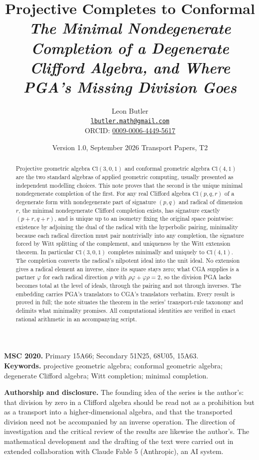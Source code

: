 \documentclass[11pt]{article}
\title{\bfseries Projective Completes to Conformal\\[4pt]
  \large\itshape The Minimal Nondegenerate Completion of a Degenerate Clifford Algebra, and Where PGA's Missing Division Goes}
\author{Leon Butler\\ \normalsize\href{mailto:lbutler.math@gmail.com}{\texttt{lbutler.math@gmail.com}}\\ \normalsize ORCID: \href{https://orcid.org/0009-0006-4449-5617}{0009-0006-4449-5617}}
\date{Version 1.0, September 2026 \textperiodcentered{} Transport Papers, T2}
\theoremstyle{definition}
\newcommand{\Cl}{\mathrm{Cl}}
\begin{document}
\maketitle

\begin{abstract}
\normalsize
Projective geometric algebra $\Cl(3,0,1)$ and conformal geometric algebra $\Cl(4,1)$ are the two standard algebras of applied geometric computing, usually presented as independent modelling choices. This note proves that the second is the unique minimal nondegenerate completion of the first. For any real Clifford algebra $\Cl(p,q,r)$ of a degenerate form with nondegenerate part of signature $(p,q)$ and radical of dimension $r$, the minimal nondegenerate Clifford completion exists, has signature exactly $(p{+}r, q{+}r)$, and is unique up to an isometry fixing the original space pointwise: existence by adjoining the dual of the radical with the hyperbolic pairing, minimality because each radical direction must pair nontrivially into any completion, the signature forced by Witt splitting of the complement, and uniqueness by the Witt extension theorem. In particular $\Cl(3,0,1)$ completes minimally and uniquely to $\Cl(4,1)$. The completion converts the radical's nilpotent ideal into the unit ideal. No extension gives a radical element an inverse, since its square stays zero; what CGA supplies is a partner $\varphi$ for each radical direction $\rho$ with $\rho\varphi + \varphi\rho = 2$, so the division PGA lacks becomes total at the level of ideals, through the pairing and not through inverses. The embedding carries PGA's translators to CGA's translators verbatim. Every result is proved in full; the note situates the theorem in the series' transport-rule taxonomy and delimits what minimality promises. All computational identities are verified in exact rational arithmetic in an accompanying script.
\end{abstract}

\medskip
\noindent\textbf{MSC 2020.} Primary 15A66; Secondary 51N25, 68U05, 15A63.\\
\textbf{Keywords.} projective geometric algebra; conformal geometric algebra; degenerate Clifford algebra; Witt completion; minimal completion.

\newpage
\textbf{Authorship and disclosure. }The founding idea of the series is the author's: that division by zero in a Clifford algebra should be read not as a prohibition but as a transport into a higher-dimensional algebra, and that the transported division need not be accompanied by an inverse operation. The direction of investigation and the critical review of the results are likewise the author's. The mathematical development and the drafting of the text were carried out in extended collaboration with Claude Fable 5 (Anthropic), an AI system.
\end{document}
